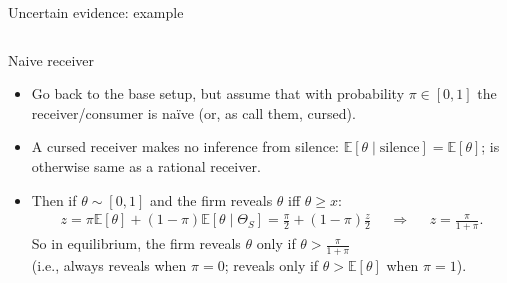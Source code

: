 \documentclass[english,10pt
,aspectratio=169
]{beamer}
\begin{document}
\begin{frame}{Uncertain evidence: example}
\begin{columns}
\begin{column}{0.4\linewidth}
	\end{column}
\end{columns}
\end{frame}


\begin{frame}{Naive receiver \citep{milgrom_relying_1986}}
\begin{itemize}
	\item Go back to the base setup, but assume that with probability $\pi \in [0,1]$ the receiver/consumer is \alert{na{\"i}ve} (or, as \cite{eyster_cursed_2005} call them, \alert{cursed}).
	
	\item A cursed receiver makes no inference from silence: $\mathbb{E}[\theta \mid \text{silence} ] = \mathbb{E}[\theta]$; is otherwise same as a rational receiver.
	
	\pause \bigskip 
	\item Then if $\theta \sim [0,1]$ and the firm reveals $\theta$ iff $\theta \geq x$:
	\begin{align*}
		z = \pi \mathbb{E}[\theta] + (1-\pi) \mathbb{E}[\theta \mid \Theta_S] = \frac{\pi}{2} + (1-\pi)\frac{z}{2}
		&& \Rightarrow &&
		z = \frac{\pi}{1+\pi}.
	\end{align*}
	So in equilibrium, the firm reveals $\theta$ only if $\theta > \frac{\pi}{1+\pi}$ \\
	(i.e., always reveals when $\pi=0$; reveals only if $\theta>\mathbb{E}[\theta]$ when $\pi=1$).
\end{itemize}
\end{frame}
\end{document}
